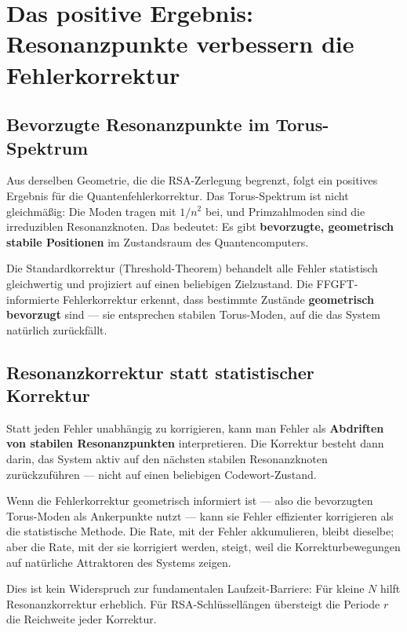 \section{Das positive Ergebnis: Resonanzpunkte verbessern die Fehlerkorrektur}

\subsection{Bevorzugte Resonanzpunkte im Torus-Spektrum}

Aus derselben Geometrie, die die RSA-Zerlegung begrenzt, folgt ein positives
Ergebnis für die Quantenfehlerkorrektur. Das Torus-Spektrum ist nicht gleichmäßig:
Die Moden tragen mit $1/n^2$ bei, und Primzahlmoden sind die irreduziblen
Resonanzknoten. Das bedeutet: Es gibt \textbf{bevorzugte, geometrisch stabile
Positionen} im Zustandsraum des Quantencomputers.

Die Standardkorrektur (Threshold-Theorem) behandelt alle Fehler statistisch
gleichwertig und projiziert auf einen beliebigen Zielzustand. Die FFGFT-informierte
Fehlerkorrektur erkennt, dass bestimmte Zustände \textbf{geometrisch bevorzugt}
sind — sie entsprechen stabilen Torus-Moden, auf die das System natürlich
zurückfällt.

\subsection{Resonanzkorrektur statt statistischer Korrektur}

Statt jeden Fehler unabhängig zu korrigieren, kann man Fehler als
\textbf{Abdriften von stabilen Resonanzpunkten} interpretieren. Die Korrektur
besteht dann darin, das System aktiv auf den nächsten stabilen Resonanzknoten
zurückzuführen — nicht auf einen beliebigen Codewort-Zustand.

\begin{keyresult}
Wenn die Fehlerkorrektur geometrisch informiert ist — also die bevorzugten
Torus-Moden als Ankerpunkte nutzt — kann sie Fehler effizienter korrigieren als
die statistische Methode. Die Rate, mit der Fehler akkumulieren, bleibt dieselbe;
aber die Rate, mit der sie korrigiert werden, steigt, weil die Korrekturbewegungen
auf natürliche Attraktoren des Systems zeigen.

Dies ist kein Widerspruch zur fundamentalen Laufzeit-Barriere: Für kleine $N$
hilft Resonanzkorrektur erheblich. Für RSA-Schlüssellängen übersteigt die
Periode $r$ die Reichweite jeder Korrektur.
\end{keyresult}

